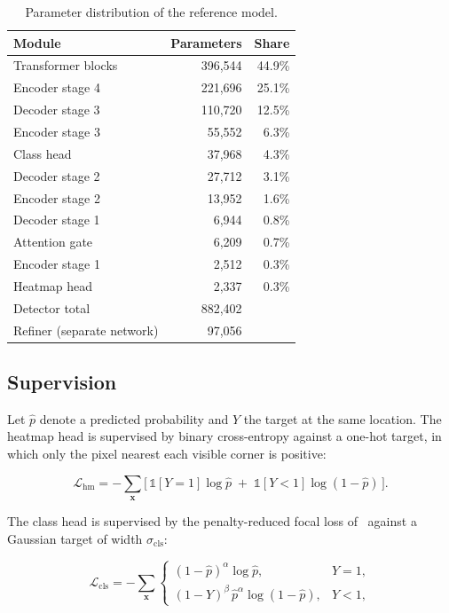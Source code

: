 \documentclass[10pt,twocolumn,letterpaper]{article}
\begin{document}
\begin{table}[t]
\centering\small
\begin{tabular}{lrr}
\toprule
Module & Parameters & Share \\
\midrule
Transformer blocks & 396,544 & 44.9\% \\
Encoder stage 4 & 221,696 & 25.1\% \\
Decoder stage 3 & 110,720 & 12.5\% \\
Encoder stage 3 & 55,552 & 6.3\% \\
Class head & 37,968 & 4.3\% \\
Decoder stage 2 & 27,712 & 3.1\% \\
Encoder stage 2 & 13,952 & 1.6\% \\
Decoder stage 1 & 6,944 & 0.8\% \\
Attention gate & 6,209 & 0.7\% \\
Encoder stage 1 & 2,512 & 0.3\% \\
Heatmap head & 2,337 & 0.3\% \\
\midrule
Detector total & 882,402 & \\
Refiner (separate network) & 97,056 & \\
\bottomrule
\end{tabular}
\caption{Parameter distribution of the reference model.}
\label{tab:params}
\end{table}

\subsection{Supervision}
\label{sec:sup}

Let $\hat p$ denote a predicted probability and $Y$ the target at the same location. The heatmap
head is supervised by binary cross-entropy against a one-hot target, in which only the pixel
nearest each visible corner is positive:

\begin{equation}
\mathcal{L}_{\mathrm{hm}} = -\!\!\sum_{\mathbf{x}}\Big[\,\mathbb{1}[Y{=}1]\log\hat p
\;+\; \mathbb{1}[Y{<}1]\log(1-\hat p)\,\Big].
\label{eq:bce}
\end{equation}

The class head is supervised by the penalty-reduced focal loss of~\cite{cornernet} against a
Gaussian target of width $\sigma_{\mathrm{cls}}$:

\begin{equation}
\mathcal{L}_{\mathrm{cls}} = -\!\!\sum_{\mathbf{x}}
\begin{cases}
(1-\hat{p})^{\alpha}\log \hat{p}, & Y = 1,\\[2pt]
(1-Y)^{\beta}\,\hat{p}^{\alpha}\log (1-\hat{p}), & Y < 1,
\end{cases}
\label{eq:focal}
\end{equation}
\end{document}
